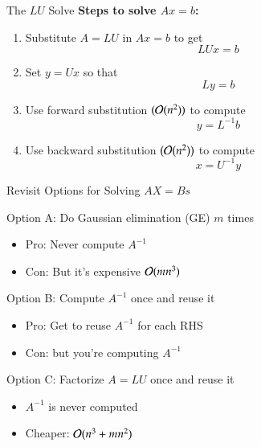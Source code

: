\documentclass[10pt]{beamer}
\begin{document}
\begin{frame}{The $LU$ Solve}
\textbf{Steps to solve $Ax=b$:}\\[4mm]

\begin{enumerate}
    \item Substitute $A=LU$ in $Ax=b$ to get 
        $$ LUx=b$$

    \item Set $y=Ux$ so that 
        $$ Ly = b$$
    \item Use forward substitution $({\mathcal{O}}(n^2))$ to compute 
        $$ y = L^{-1}b$$
    \item Use backward substitution $({\mathcal{O}}(n^2))$ to compute 
        $$ x = U^{-1}y$$
\end{enumerate}
\end{frame}
\begin{frame}{Revisit Options for Solving $AX=Bs$ }


\begin{block}{Option A: Do Gaussian elimination (GE) $m$ times }

        \begin{itemize}
            \item Pro: Never compute $A^{-1}$
            \item Con: But it's expensive ${\mathcal{O}}(m n^3)$
        \end{itemize}

\end{block}


\begin{block}{Option B: Compute $A^{-1}$ once and reuse it }
\begin{itemize}
            \item Pro: Get to reuse $A^{-1}$ for each RHS
            \item Con: but you're computing $A^{-1}$ 
\end{itemize}
\end{block}


\begin{block}{Option C: Factorize $A=LU$ once and reuse it}
        \begin{itemize}
            \item $A^{-1}$ is never computed
            \item Cheaper: ${\mathcal{O}}(n^3 + mn^2)$
        \end{itemize}    

\end{block}

\end{frame}
\end{document}
